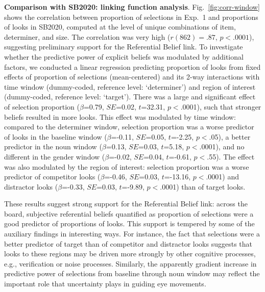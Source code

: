 \documentclass[10pt,letterpaper]{article}
\newcommand{\figref}[1]{Fig.~\ref{#1}}
\newcommand{\expref}[1]{Exp.~#1}
\newcommand{\jd}[1]{\textcolor{Red}{\textbf{[jd: #1]}}}
\begin{document}
\textbf{Comparison with SB2020: linking function analysis}. \figref{fig:corr-window} shows the correlation between  proportion of selections in \expref{1} and proportions of looks in SB2020, computed at the level of unique combinations of item, determiner, and size. The correlation was very high ($r(862) = .87$, $p < .0001$), suggesting preliminary support for the Referential Belief link. To investigate whether the predictive power of explicit beliefs was modulated by additional factors, we conducted a linear regression  %
predicting proportion of looks from fixed effects of proportion of selections (mean-centered) and its 2-way interactions with time window (dummy-coded, reference level: `determiner') and region of interest (dummy-coded, reference level: `target'). There was a large and significant effect of selection proportion  ($\beta$=0.79, $SE$=0.02, $t$=32.31, $p<$.0001), such that stronger beliefs resulted in more looks. This effect was modulated by time window: compared to the determiner window, selection proportion was a worse predictor of looks in the baseline window   ($\beta$=-0.11, $SE$=0.05, $t$=-2.25, $p<$.05), a better predictor in the noun window   ($\beta$=0.13, $SE$=0.03, $t$=5.18, $p<$.0001), and no different in the gender window    ($\beta$=-0.02, $SE$=0.04, $t$=-0.61, $p<$.55). The effect was also modulated by the region of interest: selection proportion was a worse predictor of competitor looks ($\beta$=-0.46, $SE$=0.03, $t$=-13.16, $p<$.0001) and distractor looks  ($\beta$=-0.33, $SE$=0.03, $t$=-9.89, $p<$.0001) than of target looks. %





These results suggest strong support for the Referential Belief link: across the board, subjective referential beliefs quantified as proportion of selections were a good predictor of proportions of looks. This support is tempered by some of the auxiliary findings in interesting ways. For instance, the fact that selections were a better predictor of target than of competitor and distractor looks suggests that looks to these regions may be driven more strongly by other cognitive processes, e.g.,  verification or noise processes. Similarly, the apparently gradient increase in predictive power of selections from baseline through noun window may reflect the important role that uncertainty plays in guiding eye movements.
\end{document}
